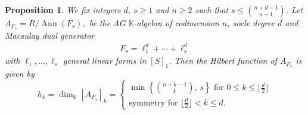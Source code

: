 \documentclass[12pt,twoside]{amsart}
\numberwithin{equation}{section} \hyphenation{semi-stable}
\newcommand{\K}{\mathbb{K}}
\DeclareMathOperator{\ann}{Ann}
\newtheorem{proposition}[theorem]{Proposition}
\theoremstyle{definition}
\begin{document}
\begin{proposition}\label{h_vector}We fix integers $d$, $s\ge 1$ and $n\ge 2$ such that $s\le {n+d-1\choose n-1}$. Let $A_{F_{s}} = R/\ann(F_{s}),$ be the AG $\K$-algebra  of codimension $n$, socle degree $d$ and Macaulay dual generator 
\begin{eqnarray*}
F_{s}=\ell_1^d+\cdots+\ell_s^d
\end{eqnarray*}
with $\ell_1,\dots,\ell_s$ general linear forms in $[S]_1$.  
Then the Hilbert function of $A_{F_{s}}$ is given by
$$
h_k=\dim_{\mathbb K}[A_{F_{s}}]_k
=\begin{cases}\min\left\{\binom{n+k-1}{k},\, s\right\} \text{ for }  0\leq k\leq\lfloor\frac{d}{2}\rfloor \\
\text{symmetry}  \text{ for } \lfloor\frac{d}{2}\rfloor < k \leq d  .
\end{cases}
$$
\end{proposition}
\end{document}

